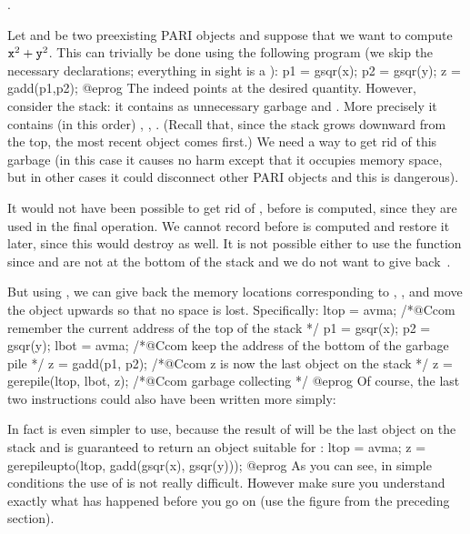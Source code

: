 .


Let  and  be two preexisting PARI objects and suppose that we
want to compute ${\tt x}^2 + {\tt y}^2$. This can trivially be done using the
following program (we skip the necessary declarations; everything in sight is
a ):
\bprog
p1 = gsqr(x);
p2 = gsqr(y); z = gadd(p1,p2);
@eprog\noindent
The   indeed points at the desired quantity. However,
consider the stack: it contains as unnecessary garbage  and .
More precisely it contains (in this order) , , .
(Recall that, since the stack grows downward from the top, the most recent
object comes first.) We need a way to get rid of this garbage (in this case
it causes no harm except that it occupies memory space, but in other cases
it could disconnect other PARI objects and this is dangerous).

It would not have been possible to get rid of ,  before
 is computed, since they are used in the final operation. We cannot
record  before  is computed and restore it later, since
this would destroy  as well. It is not possible either to use the
function  since  and  are not at the bottom of the
stack and we do not want to give back~.

But using , we can give back the memory locations corresponding
to , , and move the object  upwards so that no
space is lost. Specifically:
\bprog
  ltop = avma; /*@Ccom remember the current address of the top of the stack */
  p1 = gsqr(x); p2 = gsqr(y);
  lbot = avma; /*@Ccom keep the address of the bottom of the garbage pile */
  z = gadd(p1, p2); /*@Ccom z is now the last object on the stack */
  z = gerepile(ltop, lbot, z); /*@Ccom garbage collecting */
@eprog
\noindent Of course, the last two instructions could also have been
written more simply:


\noindent In fact  is even simpler to use, because the
result of  will be the last object on the stack and  is
guaranteed to return an object suitable for :
\bprog
  ltop = avma;
  z = gerepileupto(ltop, gadd(gsqr(x), gsqr(y)));
@eprog
\noindent
As you can see, in simple conditions the use of  is not really
difficult. However make sure you understand exactly what has happened before
you go on (use the figure from the preceding section).


